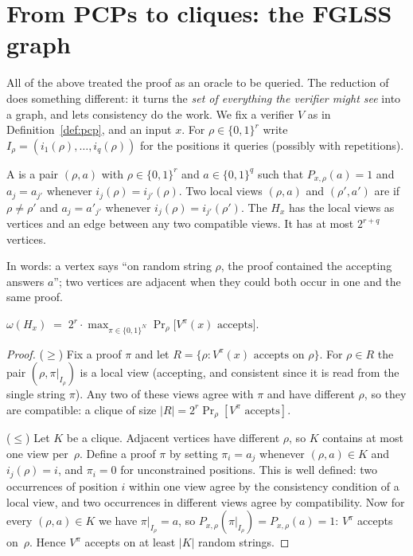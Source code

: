 \section{From PCPs to cliques: the FGLSS graph}
\label{sec:fglss}

All of the above treated the proof as an oracle to be queried.  The reduction of \citet{FGLSS96} does something different: it turns the \emph{set of everything the verifier might see} into a
graph, and lets consistency do the work.  We fix a verifier $V$ as in Definition~\ref{def:pcp}, and an input $x$.  For $\rho\in\{0,1\}^r$ write $I_\rho=(i_1(\rho),\dots,i_q(\rho))$ for the positions it queries (possibly with repetitions).

\begin{definition}\label{def:fglss}
A  is a pair $(\rho,a)$ with $\rho\in\{0,1\}^r$ and $a\in\{0,1\}^q$ such that $P_{x,\rho}(a)=1$ and $a_j=a_{j'}$ whenever $i_j(\rho)=i_{j'}(\rho)$.
Two local views $(\rho,a)$ and $(\rho',a')$ are  if $\rho\neq\rho'$ and $a_j=a'_{j'}$ whenever $i_j(\rho)=i_{j'}(\rho')$.  The  $H_x$ has the local views as vertices and an edge between
any two compatible views.  It has at most $2^{r+q}$ vertices.
\end{definition}

In words: a vertex says ``on random string $\rho$, the proof contained the accepting answers $a$''; two vertices are adjacent when they could both occur in one and the same proof.

\begin{theorem}[FGLSS]\label{thm:fglss}
$\displaystyle\omega(H_x)\;=\;2^r\cdot\max_{\pi\in\{0,1\}^N}\Pr_\rho\bigl[V^\pi(x)\text{ accepts}\bigr].$
\end{theorem}
\begin{proof}
($\ge$) Fix a proof $\pi$ and let $R=\{\rho:V^\pi(x)\text{ accepts on }\rho\}$.  For $\rho\in R$ the pair $(\rho,\pi|_{I_\rho})$ is a local view (accepting, and
consistent since it is read from the single string $\pi$).  Any two of these views agree with $\pi$ and have different $\rho$, so they are compatible: a clique of size $|R|=2^r\Pr_\rho[V^\pi\text{ accepts}]$.

($\le$) Let $K$ be a clique.  Adjacent vertices have different $\rho$, so $K$ contains at most one view per~$\rho$.  Define a proof $\pi$ by setting $\pi_i=a_j$ whenever $(\rho,a)\in K$ and $i_j(\rho)=i$, and $\pi_i=0$ for unconstrained positions.
This is well defined: two occurrences of position $i$ within one view agree by the consistency condition of a local view, and two occurrences in different views agree by compatibility.
Now for every $(\rho,a)\in K$ we have $\pi|_{I_\rho}=a$, so $P_{x,\rho}(\pi|_{I_\rho})=P_{x,\rho}(a)=1$: $V^\pi$ accepts on~$\rho$.  Hence $V^\pi$ accepts on at least $|K|$ random strings.
\end{proof}

